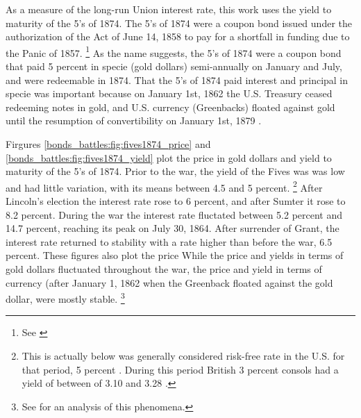 As a measure of the long-run Union interest rate, this work uses the yield to maturity of the 5's of 1874.
The 5's of 1874 were a coupon bond issued under the authorization of the Act of June 14, 1858 to pay for a shortfall in funding due to the Panic of 1857.%
\footnote{See \textcites[p. 76]{Bayley1882}[78--79]{DeKnight1900}[42-43]{Treasury1863}[300-301, 305]{HomerSylla2005}}
As the name suggests, the 5's of 1874 were a coupon bond that paid 5 percent in specie (gold dollars) semi-annually on January and July, and were redeemable in 1874.
That the 5's of 1874 paid interest and principal in specie was important because on January 1st, 1862 the U.S. Treasury ceased redeeming notes in gold, and U.S. currency (Greenbacks) floated against gold until the resumption of convertibility on January 1st, 1879 \parencites{Dewey1918}{WillardGuinnaneEtAl1996}.

Firgures \ref{bonds_battles:fig:fives1874_price} and \ref{bonds_battles:fig:fives1874_yield} plot the price in gold dollars and yield to maturity of the 5's of 1874.
Prior to the war, the yield of the Fives was was low and had little variation, with its means between 4.5 and 5 percent.%
\footnote{
  This is actually below was generally considered risk-free rate in the U.S. for that period, 5 percent \parencite[][calls it the ``natural rate'']{Elder1863}.
  During this period British 3 percent consols had a yield of between of 3.10 and 3.28 \parencite[193]{HomerSylla2005}.
}
After Lincoln's election the interest rate rose to 6 percent, and after Sumter it rose to 8.2 percent.
During the war the interest rate fluctated between 5.2 percent and 14.7 percent, reaching its peak on July 30, 1864.
After surrender of Grant, the interest rate returned to stability with a rate higher than before the war, 6.5 percent.
These figures also plot the price
While the price and yields in terms of gold dollars fluctuated throughout the war, the price and yield in terms of currency (after January 1, 1862 when the Greenback floated against the gold dollar, were mostly stable.%
\footnote{See \textcite{Roll1972} for an analysis of this phenomena.}

